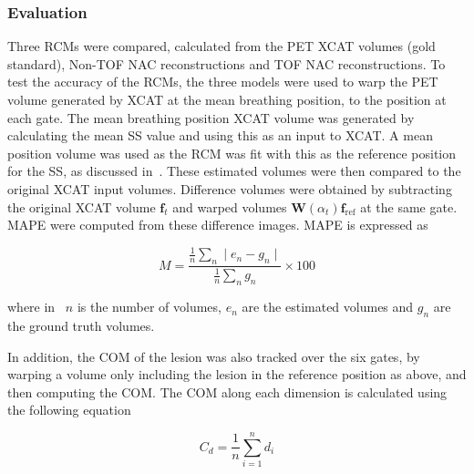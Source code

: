             \subsubsection{Evaluation} \label{sec:impact_of_tof_on_respiratory_motion_model_estimation_using_pre_gated_no_intra_cycle_motion_nac_pet_methods_evaluation}
                Three \glspl{RCM} were compared, calculated from the \gls{PET} \gls{XCAT} volumes (gold standard), \gls{Non-TOF} \gls{NAC} reconstructions and \gls{TOF} \gls{NAC} reconstructions. To test the accuracy of the \glspl{RCM}, the three models were used to warp the \gls{PET} volume generated by \gls{XCAT} at the mean breathing position, to the position at each gate. The mean breathing position \gls{XCAT} volume was generated by calculating the mean \gls{SS} value and using this as an input to \gls{XCAT}. A mean position volume was used as the \gls{RCM} was fit with this as the reference position for the \gls{SS}, as discussed in~. These estimated volumes were then compared to the original \gls{XCAT} input volumes. Difference volumes were obtained by subtracting the original \gls{XCAT} volume $\mathbf{f}_t$ and warped volumes $\mathbf{W}(\alpha_t) \mathbf{f}_\mathrm{ref}$ at the same gate. \gls{MAPE} were computed from these difference images. \gls{MAPE} is expressed as
                
                \begin{equation} \label{eq:impact_of_tof_on_respiratory_motion_model_estimation_using_pre_gated_no_intra_cycle_motion_nac_pet_methods_mape}
                   M = \frac{\frac{1}{n}\sum_{n}\mid e_n - g_n \mid}{\frac{1}{n}\sum_{n}g_n} \times 100
                \end{equation}
                
                \noindent where in~ $n$ is the number of volumes, $e_n$ are the estimated volumes and $g_n$ are the ground truth volumes.
                
                In addition, the \gls{COM} of the lesion was also tracked over the six gates, by warping a volume only including the lesion in the reference position as above, and then computing the \gls{COM}. The \gls{COM} along each dimension is calculated using the following equation
                
                \begin{equation} \label{eq:impact_of_tof_on_respiratory_motion_model_estimation_using_pre_gated_no_intra_cycle_motion_nac_pet_methods_com}
                   C_{d} = \frac{1}{n}\sum_{i = 1}^{n} d_{i}
                \end{equation}
                
